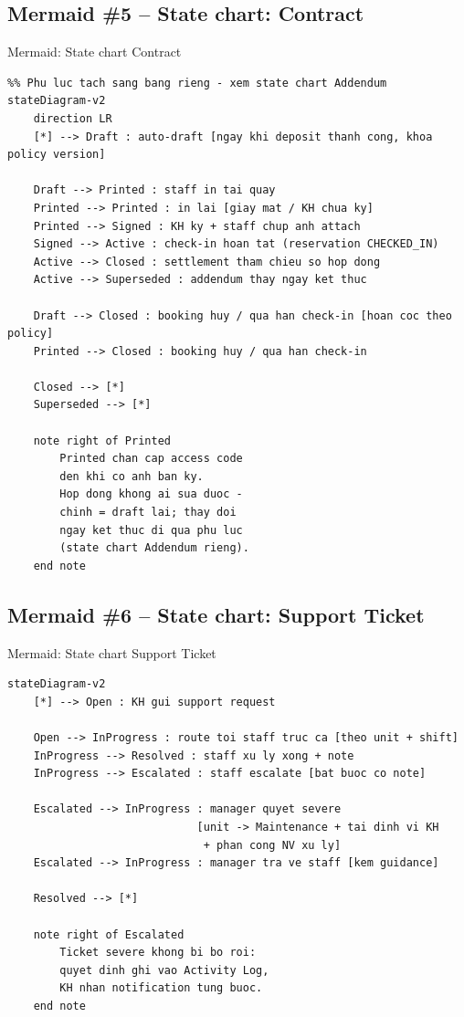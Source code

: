 \documentclass[12pt,a4paper]{article}
\renewcommand{\_}{\textunderscore\allowbreak}
\begin{document}
\subsection{Mermaid \#5 -- State chart: Contract}

\begin{mermaidbox}{Mermaid: State chart Contract}
\begin{Verbatim}[fontsize=\small]
%% StorageHub - State chart: vong doi Contract goc (CT-) - V3 2026-09-18
%% Phu luc tach sang bang rieng - xem state chart Addendum
stateDiagram-v2
    direction LR
    [*] --> Draft : auto-draft [ngay khi deposit thanh cong, khoa policy version]

    Draft --> Printed : staff in tai quay
    Printed --> Printed : in lai [giay mat / KH chua ky]
    Printed --> Signed : KH ky + staff chup anh attach
    Signed --> Active : check-in hoan tat (reservation CHECKED_IN)
    Active --> Closed : settlement tham chieu so hop dong
    Active --> Superseded : addendum thay ngay ket thuc

    Draft --> Closed : booking huy / qua han check-in [hoan coc theo policy]
    Printed --> Closed : booking huy / qua han check-in

    Closed --> [*]
    Superseded --> [*]

    note right of Printed
        Printed chan cap access code
        den khi co anh ban ky.
        Hop dong khong ai sua duoc -
        chinh = draft lai; thay doi
        ngay ket thuc di qua phu luc
        (state chart Addendum rieng).
    end note
\end{Verbatim}
\end{mermaidbox}

\subsection{Mermaid \#6 -- State chart: Support Ticket}

\begin{mermaidbox}{Mermaid: State chart Support Ticket}
\begin{Verbatim}[fontsize=\small]
%% StorageHub - State chart: vong doi Support Ticket (SR-)
stateDiagram-v2
    [*] --> Open : KH gui support request

    Open --> InProgress : route toi staff truc ca [theo unit + shift]
    InProgress --> Resolved : staff xu ly xong + note
    InProgress --> Escalated : staff escalate [bat buoc co note]

    Escalated --> InProgress : manager quyet severe
                             [unit -> Maintenance + tai dinh vi KH
                              + phan cong NV xu ly]
    Escalated --> InProgress : manager tra ve staff [kem guidance]

    Resolved --> [*]

    note right of Escalated
        Ticket severe khong bi bo roi:
        quyet dinh ghi vao Activity Log,
        KH nhan notification tung buoc.
    end note
\end{Verbatim}
\end{mermaidbox}
\end{document}
